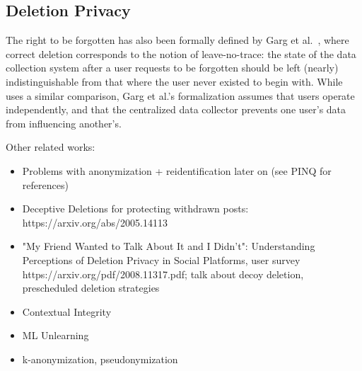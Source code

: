 \subsection{Deletion Privacy}
The right to be forgotten has also been formally defined by Garg et
al.~\cite{garg}, where correct deletion corresponds to the notion of
leave-no-trace: the state of the data collection system after a user requests to be forgotten should
be left (nearly) indistinguishable from that where the user never existed to begin with. While
\sys{} uses a similar comparison, Garg et al.'s formalization assumes that users operate
independently, and that the centralized data collector prevents one user's data from influencing
another's.

Other related works:
\begin{itemize}
    \item Problems with anonymization + reidentification later on (see PINQ for references)
    \item Deceptive Deletions for protecting withdrawn posts: https://arxiv.org/abs/2005.14113
    \item "My Friend Wanted to Talk About It and I Didn't": Understanding Perceptions of
        Deletion Privacy in Social Platforms, user survey https://arxiv.org/pdf/2008.11317.pdf;
        talk about decoy deletion, prescheduled deletion strategies~\cite{myfw}
    \item Contextual Integrity
    \item ML Unlearning
    \item k-anonymization, pseudonymization
\end{itemize}
